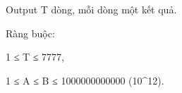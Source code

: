 Output
T dòng, mỗi dòng một kết quả.  

   Ràng buộc:  

   1 ≤ T ≤ 7777,  

   1 ≤ A ≤ B ≤ 1000000000000 (10^12).